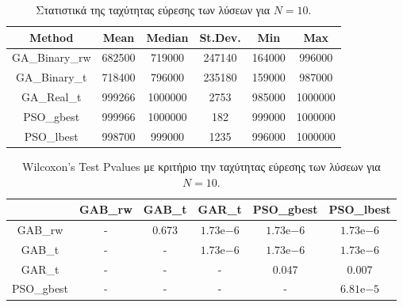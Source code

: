 \documentclass[12pt, a4paper]{article}
\newcommand{\en}{\selectlanguage{english}}
\newcommand{\gr}{\selectlanguage{greek}}
\begin{document}
\begin{table}[H]
	\centering
	\begin{tabular}{| c | c | c | c | c | c |}
		
		\hline
		\en Method & \en Mean & \en Median & \en St.Dev. & \en Min & \en Max \\
		
		\hline
		\en GA\_Binary\_rw & 682500 & 719000 & 247140 & 164000 & 996000 \\ 
		
		\hline
		\en GA\_Binary\_t & 718400 & 796000 & 235180 & 159000 & 987000 \\ 
		
		\hline
		\en GA\_Real\_t & 999266 & 1000000 & 2753 & 985000 & 1000000 \\ 
		
		\hline
		\en PSO\_gbest & 999966 & 1000000 & 182 & 999000 & 1000000\\ 
		
		\hline
		\en PSO\_lbest & 998700 & 999000 & 1235 & 996000 & 1000000 \\ 
		
		\hline
		
	\end{tabular}
	\caption{Στατιστικά της ταχύτητας εύρεσης των λύσεων για $N = 10$.}
	\label{tab:iter_N10}
\end{table}

\begin{table}[H]
	\centering
	\begin{tabular}{| c | c | c | c | c | c |}
		
		\hline
		\en  & \en GAB\_rw & \en GAB\_t & \en GAR\_t & \en PSO\_gbest & \en PSO\_lbest\\
		
		\hline
		\en GAB\_rw & - & 0.673 & $1.73\mathrm{e}{-6}$ &  $1.73\mathrm{e}{-6}$ & $1.73\mathrm{e}{-6}$ \\ 
		
		\hline
		\en GAB\_t & - & - & $1.73\mathrm{e}{-6}$ & $1.73\mathrm{e}{-6}$ & $1.73\mathrm{e}{-6}$ \\ 
		
		\hline
		\en GAR\_t & - & - & - & 0.047 & 0.007 \\ 
		
		\hline
		\en PSO\_gbest & - & - & - & - & $6.81\mathrm{e}{-5}$\\ 
		
		\hline
		
	\end{tabular}
	\caption{\en Wilcoxon's Test Pvalues \gr με κριτήριο την ταχύτητας εύρεσης των λύσεων για $N = 10$.}
	\label{tab:iter_pval_N10}
\end{table}
\end{document}
